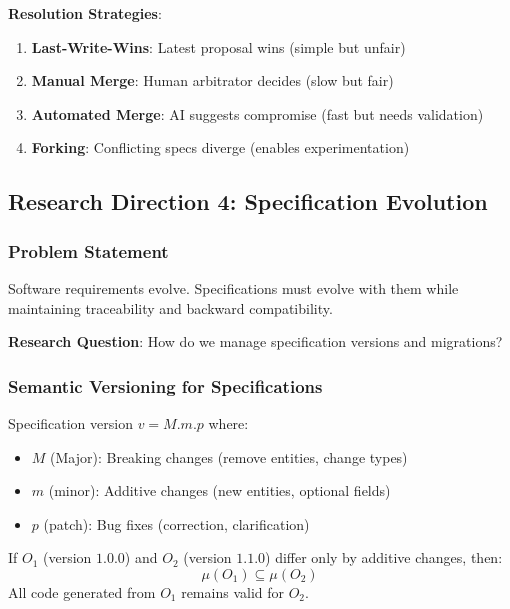 \textbf{Resolution Strategies}:
\begin{enumerate}
    \item \textbf{Last-Write-Wins}: Latest proposal wins (simple but unfair)
    \item \textbf{Manual Merge}: Human arbitrator decides (slow but fair)
    \item \textbf{Automated Merge}: AI suggests compromise (fast but needs validation)
    \item \textbf{Forking}: Conflicting specs diverge (enables experimentation)
\end{enumerate}

\subsection{Research Direction 4: Specification Evolution}

\subsubsection{Problem Statement}

Software requirements evolve. Specifications must evolve with them while maintaining traceability and backward compatibility.

\textbf{Research Question}: How do we manage specification versions and migrations?

\subsubsection{Semantic Versioning for Specifications}

\begin{definition}
    Specification version $v = M.m.p$ where:
    \begin{itemize}
        \item $M$ (Major): Breaking changes (remove entities, change types)
        \item $m$ (minor): Additive changes (new entities, optional fields)
        \item $p$ (patch): Bug fixes (correction, clarification)
    \end{itemize}
\end{definition}

\begin{theorem}
    If $O_1$ (version $1.0.0$) and $O_2$ (version $1.1.0$) differ only by additive changes, then:
    \begin{equation}
        \mu(O_1) \subseteq \mu(O_2)
    \end{equation}
    All code generated from $O_1$ remains valid for $O_2$.
\end{theorem}

